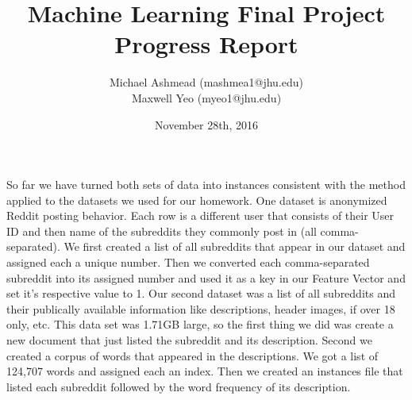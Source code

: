 \documentclass{article}
\title{Machine Learning Final Project Progress Report}
\author{Michael Ashmead (mashmea1@jhu.edu)\\Maxwell Yeo (myeo1@jhu.edu)}
\date{November 28th, 2016}
\begin{document}
\maketitle

So far we have turned both sets of data into instances consistent with the method applied to the datasets we used for our homework.  One dataset is anonymized Reddit posting behavior.  Each row is a different user that consists of their User ID and then name of the subreddits they commonly post in (all comma-separated).  We first created a list of all subreddits that appear in our dataset and assigned each a unique number.  Then we converted each comma-separated subreddit into its assigned number and used it as a key in our Feature Vector and set it's respective value to 1.  Our second dataset was a list of all subreddits and their publically available information like descriptions, header images, if over 18 only, etc.  This data set was 1.71GB large, so the first thing we did was create a new document that just listed the subreddit and its description.  Second we created a corpus of words that appeared in the descriptions.  We got a list of 124,707 words and assigned each an index.  Then we created an instances file that listed each subreddit followed by the word frequency of its description.  
\end{document}
